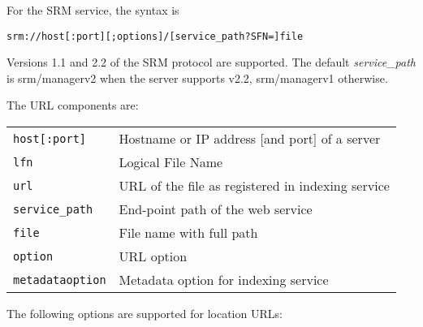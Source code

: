 For the SRM service, the syntax is
\begin{shaded}
   \verb#srm://host[:port][;options]/[service_path?SFN=]file#
\end{shaded}

Versions 1.1 and 2.2 of the SRM protocol are supported. The
default \emph{service\_path} is srm/managerv2 when the server supports
v2.2, srm/managerv1 otherwise.

The URL components are:

\begin{tabular}{lp{10cm}}
   \verb#host[:port]# & Hostname or IP address [and port] of a server\\
   \verb#lfn# & Logical File Name\\
   \verb#url# & URL of the file as registered in indexing service\\
   \verb#service_path# & End-point path of the web service\\
   \verb#file# & File name with full path\\
   \verb#option# & URL option\\
   \verb#metadataoption# & Metadata option for indexing service\\
\end{tabular}

The following options are supported for location URLs:

